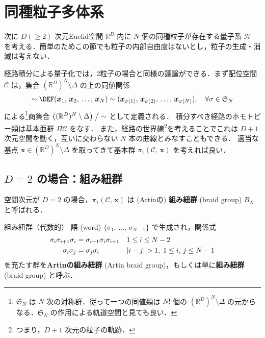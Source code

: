 \documentclass[TQFT_main]{subfiles}
\begin{document}
\section{同種粒子多体系}

次に $D (\ge 2)$ 次元Euclid空間 $\mathbb{R}^D$ 内に $N$ 個の同種粒子が存在する量子系 $\mathcal{H}$ を考える．簡単のためこの節でも粒子の内部自由度はないとし，粒子の生成・消滅は考えない．

経路積分による量子化では，2粒子の場合と同様の議論ができる．まず配位空間 $\mathcal{C}$ は，集合 $(\mathbb{R}^D)^N \setminus \Delta$ の上の同値関係
\begin{align}
    \sim \DEF (\bm{x}_1,\, \bm{x}_2,\, \dots,\, \bm{x}_N) \sim (\bm{x}_{\sigma(1)},\, \bm{x}_{\sigma(2)},\, \dots,\, \bm{x}_{\sigma(N)}),\quad \forall \sigma \in \mathfrak{S}_N
\end{align}
による\footnote{$\mathfrak{S}_N$ は $N$ 次の対称群．従って一つの同値類は $N!$ 個の $(\mathbb{R}^D)^N \setminus \Delta$ の元からなる．$\mathfrak{S}_N$ の作用による軌道空間と見ても良い．}商集合 $\bigl( (\mathbb{R}^D)^N \setminus \Delta \bigr) \bigm/ {\sim}$ として定義される．
積分すべき経路のホモトピー類は基本亜群 $\Pi \mathcal{C}$ をなす．
また，経路の世界線\footnote{つまり，$D+1$ 次元の粒子の軌跡．}を考えることでこれは $D + 1$ 次元空間を動く，互いに交わらない $N$ 本の曲線とみなすこともできる．
適当な基点 $\bm{x} \in (\mathbb{R}^D)^N \setminus \Delta$ を取ってきて基本群 $\pi_1 (\mathcal{C},\, \bm{x})$ を考えれば良い．


\subsection{$D = 2$ の場合：組み紐群}

空間次元が $D = 2$ の場合，$\pi_1 (\mathcal{C},\, \bm{x})$ は (Artinの) \textbf{組み紐群} (braid group) $B_N$ と呼ばれる．

\begin{mydef}[label=def:braidg]{組み紐群（代数的）}
    語 (word) $\{\sigma_1,\, \dots,\, \sigma_{N-1}\}$ で生成され，関係式
    \begin{align}
        \sigma_i \sigma_{i+1} \sigma_i &= \sigma_{i+1} \sigma_i \sigma_{i+1}& &1 \le i \le N - 2 \\ 
        \sigma_i \sigma_j &= \sigma_{j} \sigma_i  & &\abs{i-j} > 1,\; 1 \le i,\, j \le N - 1 \\ 
    \end{align}
    を充たす群を\textbf{Artinの組み紐群} (Artin braid group)，もしくは単に\textbf{組み紐群} (braid group) と呼ぶ．
\end{mydef}
\end{document}
